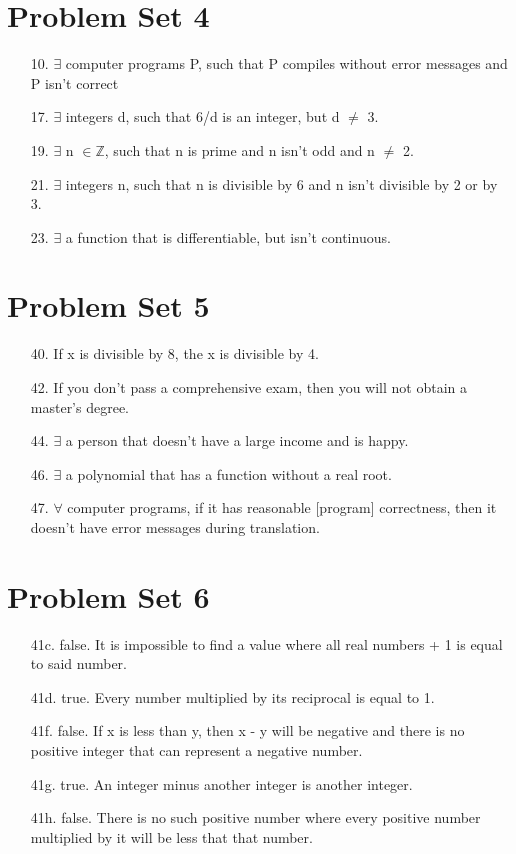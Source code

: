 \documentclass[12pt]{article}
\begin{document}
\section*{Problem Set 4}
\begin{itemize}
    \item [10.]
        $\exists$ computer programs P, such that P compiles without error messages and
        P isn't correct
    \item [17.]
        $\exists$ integers d, such that 6/d is an integer, but d $\neq$ 3.
    \item [19.]
        $\exists$ n $\in \mathbb{Z}$, such that n is prime and n isn't odd and n $\neq$ 2.
    \item [21.]
        $\exists$ integers n, such that n is divisible by 6 and n isn't divisible by 2
        or by 3.
    \item [23.]
        $\exists$ a function that is differentiable, but isn't continuous.
\end{itemize}

\section*{Problem Set 5}
\begin{itemize}
    \item [40.]
        If x is divisible by 8, the x is divisible by 4.
    \item [42.]
        If you don't pass a comprehensive exam, then you will not obtain a master’s degree.
    \item [44.]
        $\exists$ a person that doesn't have a large income and is happy.
    \item [46.]
        $\exists$ a polynomial that has a function without a real root.
    \item [47.]
        $\forall$ computer programs, if it has reasonable [program] correctness, then it
        doesn't have error messages during translation.
\end{itemize}

\section*{Problem Set 6}
\begin{itemize}
    \item [41c.]
        false. It is impossible to find a value where all real numbers + 1 is equal
        to said number.
    \item [41d.]
        true. Every number multiplied by its reciprocal is equal to 1.
    \item [41f.]
        false. If x is less than y, then x - y will be negative and there is no positive
        integer that can represent a negative number.
    \item [41g.]
        true. An integer minus another integer is another integer.
    \item [41h.]
        false. There is no such positive number where every positive number multiplied
        by it will be less that that number.
\end{itemize}
\end{document}
